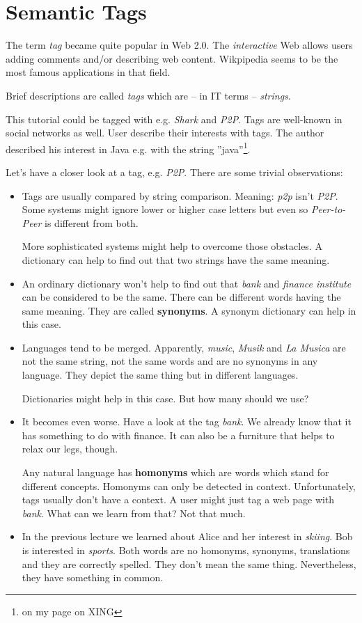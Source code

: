 \chapter{Semantic Tags}
The term {\it tag} became quite popular in Web 2.0. The {\it interactive} Web allows users adding comments and/or describing web content. Wikpipedia seems to be the most famous applications in that field. 

Brief descriptions are called {\it tags} which are -- in IT terms -- {\it strings}.

This tutorial could be tagged with e.g. {\it Shark} and {\it P2P}.
Tags are well-known in social networks as well. User describe their interests with tags. The author described his interest in Java e.g. with the string ''java''\footnote{on my page on XING}.

Let's have a closer look at a tag, e.g. {\it P2P}. There are some trivial observations:

\begin{itemize}
\item 
Tags are usually compared by string comparison. Meaning: {\it p2p} isn't {\it P2P}. Some systems might ignore lower or higher case letters but even so {\it Peer-to-Peer} is different from both. 

More sophisticated systems might help to overcome those obstacles. A dictionary can help to find out that two strings have the same meaning.

\item
An ordinary dictionary won't help to find out that {\it bank} and {\it finance institute} can be considered to be the same. There can be different words having the same meaning. They are called {\bf synonyms}. A synonym dictionary can help in this case.

\item
Languages tend to be merged. Apparently, {\it music}, {\it Musik} and {\it La Musica} are not the same string, not the same words and are no synonyms in any language. They depict the same thing but in different languages.

Dictionaries might help in this case. But how many should we use?

\item
It becomes even worse. Have a look at the tag {\it bank}. We already know that it has something to do with finance. It can also be a furniture that helps to relax our legs, though. 

Any natural language has {\bf homonyms} which are words which stand for different concepts. Homonyms can only be detected in context. Unfortunately, tags usually don't have a context. A user might just tag a web page with {\it bank}. What can we learn from that? Not that much.

\item
In the previous lecture we learned about Alice and her interest in {\it skiing}.
Bob is interested in {\it sports}. Both words are no homonyms, synonyms, translations and they are correctly spelled. They don't mean the same thing. Nevertheless, they have something in common.

\end{itemize}

